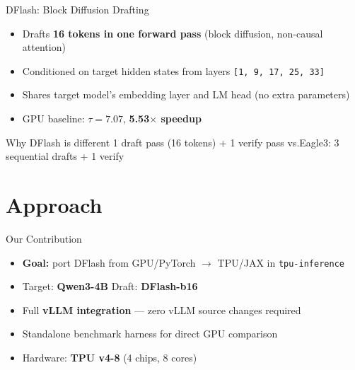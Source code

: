 \documentclass[10pt]{beamer}
\begin{document}
\begin{frame}{DFlash: Block Diffusion Drafting}
\begin{itemize}
  \item Drafts \textbf{16 tokens in one forward pass} (block diffusion, non-causal attention)
  \item Conditioned on target hidden states from layers \texttt{[1, 9, 17, 25, 33]}
  \item Shares target model's embedding layer and LM head (no extra parameters)
  \item GPU baseline: $\tau = 7.07$, \textbf{5.53$\times$ speedup}
\end{itemize}

\begin{alertblock}{Why DFlash is different}
1 draft pass (16 tokens) + 1 verify pass \quad vs.\quad Eagle3: 3 sequential drafts + 1 verify
\end{alertblock}
\end{frame}

\section{Approach}

\begin{frame}{Our Contribution}
\begin{itemize}
  \item \textbf{Goal:} port DFlash from GPU/PyTorch $\rightarrow$ TPU/JAX in \texttt{tpu-inference}
  \item Target: \textbf{Qwen3-4B} \quad Draft: \textbf{DFlash-b16}
  \item Full \textbf{vLLM integration} --- zero vLLM source changes required
  \item Standalone benchmark harness for direct GPU comparison
  \item Hardware: \textbf{TPU v4-8} (4 chips, 8 cores)
\end{itemize}
\end{frame}
\end{document}
